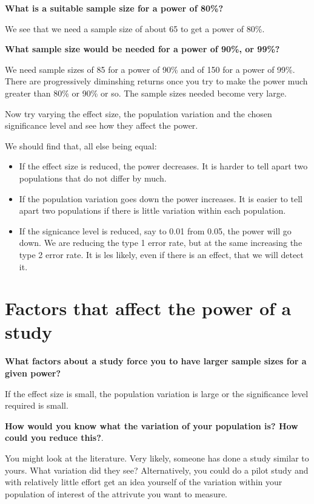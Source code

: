 \documentclass[
  letterpaper,
  DIV=11,
  numbers=noendperiod]{scrreprt}
\providecommand{\tightlist}{%
  \setlength{\itemsep}{0pt}\setlength{\parskip}{0pt}}\usepackage{longtable,booktabs,array}
\begin{document}
\textbf{What is a suitable sample size for a power of 80\%?}

We see that we need a sample size of about 65 to get a power of 80\%.

\textbf{What sample size would be needed for a power of 90\%, or 99\%?}

We need sample sizes of 85 for a power of 90\% and of 150 for a power of
99\%. There are progressively diminshing returns once you try to make
the power much greater than 80\% or 90\% or so. The sample sizes needed
become very large.

Now try varying the effect size, the population variation and the chosen
significance level and see how they affect the power.

We should find that, all else being equal:

\begin{itemize}
\tightlist
\item
  If the effect size is reduced, the power decreases. It is harder to
  tell apart two populations that do not differ by much.
\item
  If the population variation goes down the power increases. It is
  easier to tell apart two populations if there is little variation
  within each population.
\item
  If the signicance level is reduced, say to 0.01 from 0.05, the power
  will go down. We are reducing the type 1 error rate, but at the same
  increasing the type 2 error rate. It is les likely, even if there is
  an effect, that we will detect it.
\end{itemize}

\section{Factors that affect the power of a
study}\label{factors-that-affect-the-power-of-a-study}

\textbf{What factors about a study force you to have larger sample sizes
for a given power?}

If the effect size is small, the population variation is large or the
significance level required is small.

\textbf{How would you know what the variation of your population is? How
could you reduce this?}.

You might look at the literature. Very likely, someone has done a study
similar to yours. What variation did they see? Alternatively, you could
do a pilot study and with relatively little effort get an idea yourself
of the variation within your population of interest of the attrivute you
want to measure.
\end{document}
